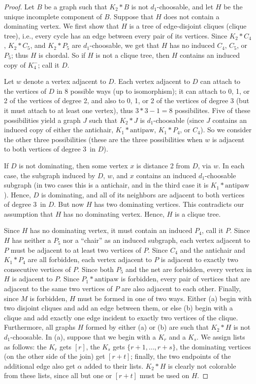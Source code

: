 \begin{proof}
Let $B$ be a graph such that $K_2*B$ is not $d_1$-choosable, and let $H$ be
the unique incomplete component of $B$.  Suppose that $H$ does not contain a
dominating vertex.
We first show that $H$ is a tree of edge-disjoint cliques (clique tree), i.e.,
every cycle has an edge between every pair of its vertices.  Since $K_2*C_4$,
$K_2*C_5$, and $K_2*P_5$ are $d_1$-choosable, we get that $H$ has no induced
$C_4$, $C_5$,
or $P_5$; thus $H$ is chordal.  So if $H$ is not a clique tree,
then $H$ contains an induced copy of $K_4^-$; call it $D$.

Let $w$ denote a vertex adjacent to $D$.
Each vertex adjacent to $D$ can attach to the vertices of $D$ in 8 possible
ways (up to isomorphism);
it can attach to 0, 1, or 2 of the vertices of degree 2, and also to 0, 1, or
2 of the vertices of degree 3 (but it must attach to at least one vertex),
thus $3*3-1=8$ possibilites.  Five of
these possibilities yield a graph $J$ such that $K_2*J$ is $d_1$-choosable
(since $J$ contains an induced copy of either the antichair, $K_1*\mbox{antipaw}$,
$K_1*P_4$, or $C_4$). 
So we consider the other three possibilities (these are the three possibilities
when $w$ is adjacent to both vertices of degree 3\ in $D$).  

If $D$ is not dominating, then some vertex $x$ is distance 2 from $D$, via $w$. 
In each case, the subgraph induced by $D$, $w$, and $x$ contains an induced
$d_1$-choosable subgraph (in two cases this is a antichair, and in the third case it
is $K_1*\mbox{antipaw}$). Hence, $D$ is dominating, and all of its neighbors
are adjacent to both vertices of degree 3\ in $D$.  But now $H$ has two
dominating vertices.  This contradicts our assumption that $H$ has no
dominating vertex.  Hence, $H$ is a clique tree.

Since $H$ has no dominating vertex, it must contain an induced $P_4$, call it
$P$.  Since $H$ has neither a $P_5$ nor a ``chair'' as an induced subgraph,
each vertex adjacent to $P$ must be adjacent to at least two vertices of $P$.
Since $C_4$ and the antichair and $K_1*P_4$ are all forbidden, each vertex adjacent
to $P$ is adjacent to exactly two consecutive vertices of $P$.  Since both $P_5$
and the net are forbidden, every vertex in $H$ is adjacent to $P$.  Since
$P_1*\mbox{antipaw}$ is forbidden, every pair of vertices that are adjacent to
the same two vertices of $P$ are also adjacent to each other.  Finally, since
$M$ is forbidden, $H$ must be formed in one of two ways.  Either (a) begin with
two disjoint cliques and add an edge between them, or else (b) begin with a
clique and add exactly one edge incident to exactly two vertices of the clique.
Furthermore, all graphs $H$ formed by either (a) or (b) are such that $K_2*H$ 
is not $d_1$-choosable.
In (a), suppose that we begin with a $K_r$ and a $K_s$.  We assign lists as
follows: the $K_r$ gets $[r]$, the $K_s$ gets
$\{r+1,\ldots, r+s\}$, the dominating vertices (on the other side of the join) 
get $[r+t]$; finally, the two endpoints of the additional edge also get
$\alpha$ added to their lists.  $K_2*H$ is clearly not colorable from these
lists, since all but one or $[r+t]$ must be used on $H$.


\end{proof}

